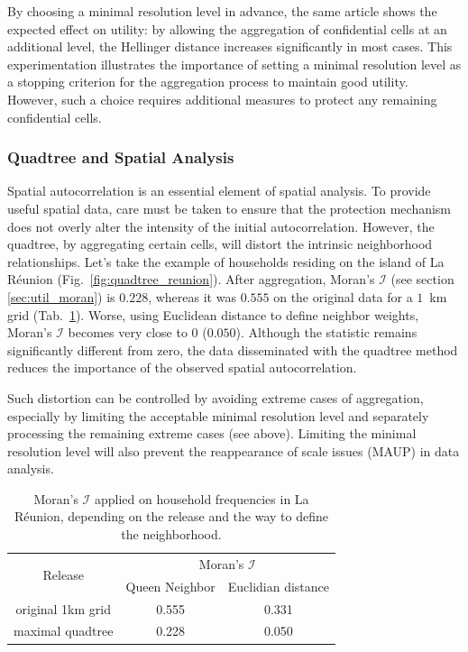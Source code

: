 By choosing a minimal resolution level in advance, the same article shows the expected effect on utility: by allowing the aggregation of confidential cells at an additional level, the Hellinger distance increases significantly in most cases. This experimentation illustrates the importance of setting a minimal resolution level as a stopping criterion for the aggregation process to maintain good utility. However, such a choice requires additional measures to protect any remaining confidential cells.

\subsubsection{Quadtree and Spatial Analysis}

Spatial autocorrelation is an essential element of spatial analysis. To provide useful spatial data, care must be taken to ensure that the protection mechanism does not overly alter the intensity of the initial autocorrelation. However, the quadtree, by aggregating certain cells, will distort the intrinsic neighborhood relationships. Let's take the example of households residing on the island of La Réunion (Fig.~\ref{fig:quadtree_reunion}). After aggregation, Moran's $\mathcal{I}$ (see section \ref{sec:util_moran}) is $0.228$, whereas it was $0.555$ on the original data for a $1$~km grid (Tab.~\ref{tab:MoranI_reunion}). Worse, using Euclidean distance to define neighbor weights, Moran's $\mathcal{I}$ becomes very close to $0$ ($0.050$). Although the statistic remains significantly different from zero, the data disseminated with the quadtree method reduces the importance of the observed spatial autocorrelation.

Such distortion can be controlled by avoiding extreme cases of aggregation, especially by limiting the acceptable minimal resolution level and separately processing the remaining extreme cases (see above). Limiting the minimal resolution level will also prevent the reappearance of scale issues (MAUP) in data analysis.

\begin{table}
    \centering
    \begin{tabular}{ccc}
        \toprule
        \multirow{2}{*}{Release} & \multicolumn{2}{c}{Moran's $\mathcal{I}$} \\
        \cmidrule{2-3}
                                 & Queen Neighbor & Euclidian distance\\
        \midrule
        original 1km grid        & 0.555          & 0.331 \\
        maximal quadtree         & 0.228          & 0.050 \\
        \bottomrule
    \end{tabular}
    \caption{Moran's $\mathcal{I}$ applied on household frequencies in La Réunion, depending on the release and the way to define the neighborhood.}
    \label{tab:MoranI_reunion}
\end{table}

